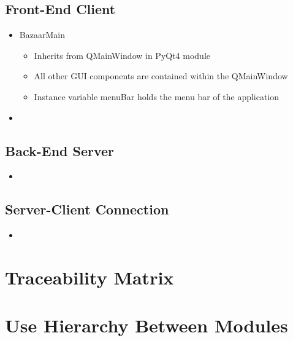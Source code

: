 \documentclass{article}
\begin{document}
\subsection*{Front-End Client}
\begin{itemize}
\item
BazaarMain

\begin{itemize}
\item
Inherits from QMainWindow in PyQt4 module

\item
All other GUI components are contained within the QMainWindow

\item
Instance variable menuBar holds the menu bar of the application
\end{itemize}

\item
\end{itemize}


\subsection*{Back-End Server}
\begin{itemize}
\item

\end{itemize}

\subsection*{Server-Client Connection}
\begin{itemize}
\item

\end{itemize}

\section*{Traceability Matrix}

\section*{Use Hierarchy Between Modules}
\end{document}
